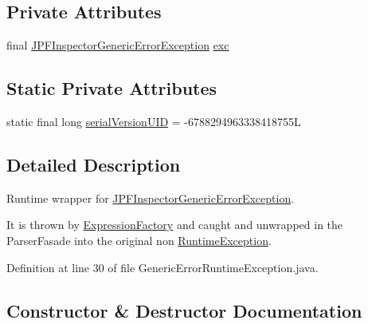 \subsection*{Private Attributes}
\begin{DoxyCompactItemize}
\item 
final \hyperlink{classgov_1_1nasa_1_1jpf_1_1inspector_1_1exceptions_1_1_j_p_f_inspector_generic_error_exception}{J\+P\+F\+Inspector\+Generic\+Error\+Exception} \hyperlink{classgov_1_1nasa_1_1jpf_1_1inspector_1_1utils_1_1parser_1_1_generic_error_runtime_exception_a9e1bc226c1606c43c4f3d7901af26a43}{exc}
\end{DoxyCompactItemize}
\subsection*{Static Private Attributes}
\begin{DoxyCompactItemize}
\item 
static final long \hyperlink{classgov_1_1nasa_1_1jpf_1_1inspector_1_1utils_1_1parser_1_1_generic_error_runtime_exception_abd705fbb0596bb1f7f633fa26f79a4f0}{serial\+Version\+U\+ID} = -\/6788294963338418755L
\end{DoxyCompactItemize}


\subsection{Detailed Description}
Runtime wrapper for \hyperlink{}{J\+P\+F\+Inspector\+Generic\+Error\+Exception}. 

It is thrown by \hyperlink{}{Expression\+Factory} and caught and unwrapped in the Parser\+Fasade into the original non \hyperlink{}{Runtime\+Exception}. 

Definition at line 30 of file Generic\+Error\+Runtime\+Exception.\+java.



\subsection{Constructor \& Destructor Documentation}
